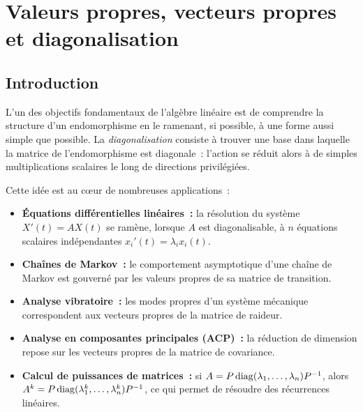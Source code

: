 
\chapter{Valeurs propres, vecteurs propres et diagonalisation}\label{ch:valeurs-propres}

\section*{Introduction}

L'un des objectifs fondamentaux de l'algèbre linéaire est de comprendre
la structure d'un endomorphisme en le ramenant, si possible, à une forme
aussi simple que possible. La \emph{diagonalisation}
consiste à trouver une base dans laquelle la matrice de l'endomorphisme
est diagonale~: l'action se réduit alors à de simples multiplications
scalaires le long de directions privilégiées.

\medskip

Cette idée est au c\oe ur de nombreuses applications~:
\begin{itemize}
  \item \textbf{Équations différentielles linéaires~:}
    la résolution du système $X'(t)=AX(t)$ se ramène, lorsque $A$ est
    diagonalisable, à $n$ équations scalaires indépendantes
    $x_i'(t)=\lambda_i x_i(t)$.
  \item \textbf{Chaînes de Markov~:} le
    comportement asymptotique d'une chaîne de Markov est gouverné par
    les valeurs propres de sa matrice de transition.
  \item \textbf{Analyse vibratoire~:} les modes propres
    d'un système mécanique correspondent aux vecteurs propres de la
    matrice de raideur.
  \item \textbf{Analyse en composantes principales (ACP)~:}
    la réduction de dimension repose sur les vecteurs propres de la
    matrice de covariance.
  \item \textbf{Calcul de puissances de matrices~:} si $A=P\operatorname{diag}(\lambda_1,
    \ldots,\lambda_n){P}^{-1}$, alors $A^k=P\operatorname{diag}(\lambda_1^k,\ldots,
    \lambda_n^k){P}^{-1}$, ce qui permet de résoudre des récurrences
    linéaires.
\end{itemize}

